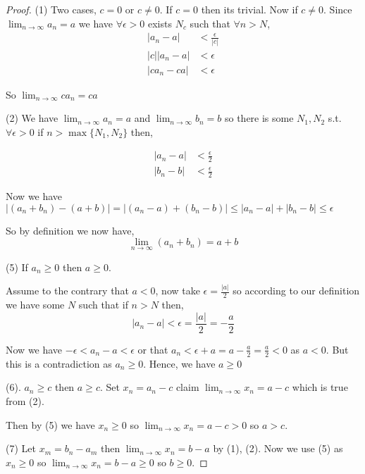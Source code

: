 \begin{proof} 
    (1) Two cases, $c = 0$ or  $c \ne 0$. If  $c = 0$ then its trivial. Now if  $c \ne 0$. Since $\lim_{n \to \infty} a_n = a$ we have $\forall \epsilon > 0$ exists $N_c$ such that $\forall n > N$, 
    \begin{align*}
        |a_n - a| &< \frac{\epsilon}{|c|}\\
        |c||a_n - a| &< \epsilon\\
        |ca_n - ca| &< \epsilon
    \end{align*}

    So $\lim_{n \to \infty} c a_n = ca$



    (2) We have $\lim_{n \to \infty} a_n = a$ and $\lim_{n \to \infty} b_n = b $ so there is some $N_1, N_2$ s.t.  $\forall \epsilon > 0$ if $n > \max\{N_1, N_2\}$ then, 

    \begin{align*}
        |a_n - a| &< \frac{\epsilon}{2}\\
        |b_n - b |&< \frac{\epsilon}{2}
    \end{align*}


    Now we have $|(a_n + b_n) - (a + b)| = |(a_n - a) + (b_n - b)| \le |a_n - a| + |b_n - b| \le \epsilon  $


    So by definition we now have, 
    $$ \lim_{n \to \infty} (a_n + b_n) = a + b $$ 



    (5) If $a_n \ge 0$ then  $a \ge 0$.

    Assume to the contrary that $a < 0$, now take  $\epsilon = \frac{|a|}{2}$ so according to our definition we have some $N$ such that if $ n > N$ then, 
    $$ |a_n - a| < \epsilon = \frac{|a|}{2} =-\frac{a}{2} $$ 


    Now we have $ - \epsilon< a_n - a < \epsilon$ or that $a_n< \epsilon + a = a - \frac{a}{2} = \frac{a}{2} < 0$ as $a < 0$. But this is a contradiction as  $a_n \ge 0$. Hence, we have $a \ge 0$


    \vspace{1em}

    (6). $a_n \ge c$ then  $a \ge c$. Set  $x_n = a_n - c$ claim  $\lim_{n \to \infty} x_n = a - c$ which is true from (2). 

    Then by (5) we have $x_n \ge 0$ so  $\lim_{n \to \infty} x_n = a- c > 0$ so $a > c$.

    \vspace{1em}

    (7) Let $x_m = b_n - a_m$ then  $\lim_{n \to \infty} x_n = b - a$ by (1), (2). Now we use (5)  as $x_n \ge 0$ so  $\lim_{n \to \infty} x_n = b - a \ge 0$ so $b \ge 0$.
\end{proof}

